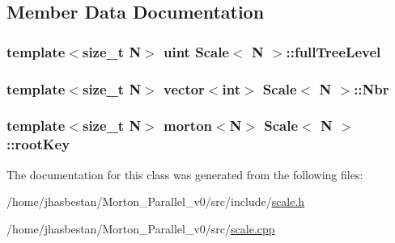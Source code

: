 \subsection{Member Data Documentation}
\hypertarget{classScale_a346a8932dff67a83f5d4c52f0dd854d7}{
\subsubsection[{fullTreeLevel}]{\setlength{\rightskip}{0pt plus 5cm}template$<$size\_\-t N$>$ uint {\bf Scale}$<$ N $>$::{\bf fullTreeLevel}}}
\label{classScale_a346a8932dff67a83f5d4c52f0dd854d7}
\hypertarget{classScale_a1e38e92d1d5dc5827d42b50d1d15de02}{
\subsubsection[{Nbr}]{\setlength{\rightskip}{0pt plus 5cm}template$<$size\_\-t N$>$ vector$<$int$>$ {\bf Scale}$<$ N $>$::{\bf Nbr}}}
\label{classScale_a1e38e92d1d5dc5827d42b50d1d15de02}
\hypertarget{classScale_a791e37e8f1f874120767ca2ee4d4d980}{
\subsubsection[{rootKey}]{\setlength{\rightskip}{0pt plus 5cm}template$<$size\_\-t N$>$ morton$<$N$>$ {\bf Scale}$<$ N $>$::{\bf rootKey}}}
\label{classScale_a791e37e8f1f874120767ca2ee4d4d980}


The documentation for this class was generated from the following files:\begin{DoxyCompactItemize}
\item 
/home/jhasbestan/Morton\_\-Parallel\_\-v0/src/include/\hyperlink{scale_8h}{scale.h}\item 
/home/jhasbestan/Morton\_\-Parallel\_\-v0/src/\hyperlink{scale_8cpp}{scale.cpp}\end{DoxyCompactItemize}
